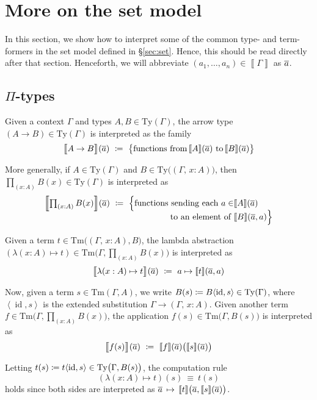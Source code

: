 \documentclass{article}
\theoremstyle{definition}
\renewcommand{\int}[1]{\mathopen{}\left\llbracket #1
    \right\rrbracket\mathclose{}}       %
\newcommand{\Pii}[2]{\textstyle\prod_{#1} #2}             %
\newcommand{\lam}[2]{\lambda #1 \mapsto #2}
\newcommand{\substType}[2]{#2#1}%
\newcommand{\substTerm}[2]{#2#1}%
\newcommand{\extsub}[2]{\ang{#1,#2}}
\newcommand{\Ty}{\mathrm{Ty}}
\newcommand{\Tm}{\mathrm{Tm}}
\DeclareMathOperator{\id}{id}				    %
\newcommand{\defeq}{
	\mathrel{\mathrel{\mathop:}\mkern-1.2mu=}}	%
\newcommand{\tup}[1]{\overline{\smash{#1}\vphantom{a}}}
\newcommand{\ang}[1]{\mathopen{}\left\langle #1 \right\rangle\mathclose{}}
\newcommand{\n}{%
}                %
\begin{document}
\appendix

\section{More on the set model}
\label{app:set}

In this section, we show how to interpret some of the common type- and term-formers in the set model defined in \S\ref{sec:set}. Hence, this should be read directly after that section. Henceforth, we will abbreviate $(a_1,\ldots,a_n) \in \int{\Gamma}$ as $\tup{a}$.


\subsection{\texorpdfstring{$\Pi$}{Pi}-types}

Given a context $\Gamma$ and types $A, B \in \Ty(\Gamma)$, the arrow type $(A \to B) \in \Ty(\Gamma)$ is interpreted as the family
$$\int{\big.A \to B}\n(\tup{a})\ \defeq\ \big\{ \text{functions from}\, \int{A}\n(\tup{a}) \text{ to}\, \int{B}\n(\tup{a}) \big\} $$

More generally, if $A \in \Ty(\Gamma)$ and $B \in \Ty \big( (\Gamma,\, x:A) \big)$, then $\Pii{(x:A)}{B(x)}\in \Ty(\Gamma)$ is interpreted as
\begin{align*}
    \int{\Pii{(x:A)}{B(x)}}(\tup{a})\ \defeq\ \Big\{ \text{functions sending each } a \in &\int{A}\n(\tup{a}) \\[-2mm]
    \text{ to an element of } &\int{B}\n(\tup{a},a) \Big\}
\end{align*}

Given a term $t \in \Tm \big( (\Gamma,\, x:A), B \big)$, the lambda abstraction $(\lam{(x:A)}{t}) \in \Tm\big( \Gamma, \Pii{(x:A)}{B(x)} \big)$ is interpreted as
$$\int{\big.\lam{(x:A)}{t}}\n(\tup{a})\ \defeq\ a %
\mapsto \int{t}\n(\tup{a},a)$$

Now, given a term $s \in \Tm(\Gamma, A)$, we write $B(s) \defeq \substType{\extsub{\id}{s}}{B} \in \Ty(\Gamma)$, where $\extsub{\id}{s}$ is the extended substitution $\Gamma \to (\Gamma,\, x:A)$. Given another term $f \in \Tm\big( \Gamma, \Pii{(x:A)}{B(x)} \big)$, the application $f(s) \in \Tm\big(\Gamma,B(s) \big)$ is interpreted as
$$\int{\big.f(s)
}\n(\tup{a})\ \defeq\ \int{f}\n(\tup{a}) \big( \int{s}\n(\tup{a}) \big)$$

Letting $t(s) \defeq \substTerm{\extsub{\id}{s}}{t} \in \Ty\big(\Gamma,B(s)\big)$, the computation rule $$(\lam{(x:A)}{t})(s)\ \equiv\ t(s)$$ holds since both sides are interpreted as $\tup{a}\, \mapsto\, \int{t}\n\big(\tup{a}, \int{s}\n(\tup{a}) \big)$.
\end{document}
